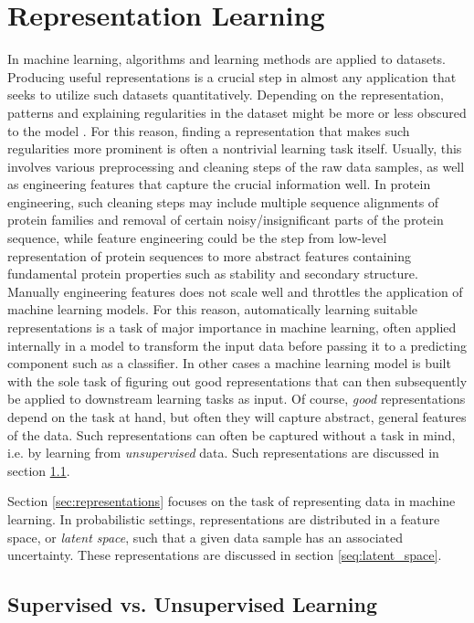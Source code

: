 \chapter{Representation Learning}
\label{chapter:representation_learning}
In machine learning, algorithms and learning methods are applied to datasets. Producing useful representations is a crucial step in almost any application that seeks to utilize such datasets quantitatively. Depending on the representation, patterns and explaining regularities in the dataset might be more or less obscured to the model \cite{bengio2013representation}. For this reason, finding a representation that makes such regularities more prominent is often a nontrivial learning task itself. Usually, this involves various preprocessing and cleaning steps of the raw data samples, as well as engineering features that capture the crucial information well. In protein engineering, such cleaning steps may include multiple sequence alignments of protein families and removal of certain noisy/insignificant parts of the protein sequence, while feature engineering could be the step from low-level representation of protein sequences to more abstract features containing fundamental protein properties such as stability and secondary structure. Manually engineering features does not scale well and throttles the application of machine learning models. For this reason, automatically learning suitable representations is a task of major importance in machine learning, often applied internally in a model to transform the input data before passing it to a predicting component such as a classifier. In other cases a machine learning model is built with the sole task of figuring out good representations that can then subsequently be applied to downstream learning tasks as input. Of course, \textit{good} representations depend on the task at hand, but often they will capture abstract, general features of the data. Such representations can often be captured without a task in mind, i.e. by learning from \textit{unsupervised} data. Such representations are discussed in section \ref{sec:supervised_vs_unsupervised}. 

Section \ref{sec:representations} focuses on the task of representing data in machine learning. In probabilistic settings, representations are distributed in a feature space, or \textit{latent space}, such that a given data sample has an associated uncertainty. These representations are discussed in section \ref{seq:latent_space}.

\section{Supervised vs. Unsupervised Learning}
\label{sec:supervised_vs_unsupervised}

